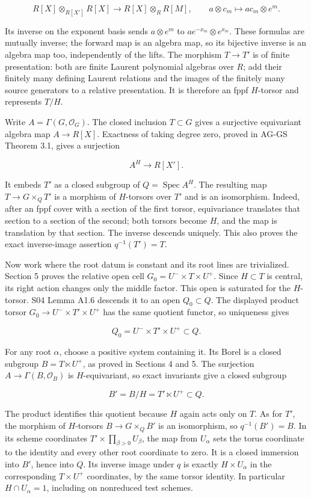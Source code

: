 \documentclass[11pt,a4paper,openany]{report}
\begin{document}
\[
R[X]\otimes_{R[X']}R[X]\longrightarrow R[X]\otimes_RR[M],
\qquad a\otimes c_m\longmapsto ac_m\otimes e^m.
\]

Its inverse on the exponent basis sends \(a\otimes e^m\) to \(ae^{-x_m}\otimes e^{x_m}\). These formulas are mutually inverse; the forward map is an algebra map, so its bijective inverse is an algebra map too, independently of the lifts. The morphism \(T\to T'\) is of finite presentation: both are finite Laurent polynomial algebras over \(R\); add their finitely many defining Laurent relations and the images of the finitely many source generators to a relative presentation. It is therefore an fppf \(H\)-torsor and represents \(T/H\).

Write \(A=\Gamma(G,\mathcal O_G)\). The closed inclusion \(T\subset G\) gives a surjective equivariant algebra map \(A\to R[X]\). Exactness of taking degree zero, proved in AG-GS Theorem 3.1, gives a surjection

\[
A^H\longrightarrow R[X'].
\]

It embeds \(T'\) as a closed subgroup of \(Q=\operatorname{Spec}A^H\). The resulting map \(T\to G\times_QT'\) is a morphism of \(H\)-torsors over \(T'\) and is an isomorphism. Indeed, after an fppf cover with a section of the first torsor, equivariance translates that section to a section of the second; both torsors become \(H\), and the map is translation by that section. The inverse descends uniquely. This also proves the exact inverse-image assertion \(q^{-1}(T')=T\).

Now work where the root datum is constant and its root lines are trivialized. Section 5 proves the relative open cell \(G_0=U^-\times T\times U^+\). Since \(H\subset T\) is central, its right action changes only the middle factor. This open is saturated for the \(H\)-torsor. S04 Lemma A1.6 descends it to an open \(Q_0\subset Q\). The displayed product torsor \(G_0\to U^-\times T'\times U^+\) has the same quotient functor, so uniqueness gives

\[
Q_0=U^-\times T'\times U^+\subset Q.
\tag{7.1}
\]

For any root \(\alpha\), choose a positive system containing it. Its Borel is a closed subgroup \(B=T\ltimes U^+\), as proved in Sections 4 and 5. The surjection \(A\to\Gamma(B,\mathcal O_B)\) is \(H\)-equivariant, so exact invariants give a closed subgroup

\[
B'=B/H=T'\ltimes U^+\subset Q.
\]

The product identifies this quotient because \(H\) again acts only on \(T\). As for \(T'\), the morphism of \(H\)-torsors \(B\to G\times_QB'\) is an isomorphism, so \(q^{-1}(B')=B\). In its scheme coordinates \(T'\times\prod_{\beta>0}U_\beta\), the map from \(U_\alpha\) sets the torus coordinate to the identity and every other root coordinate to zero. It is a closed immersion into \(B'\), hence into \(Q\). Its inverse image under \(q\) is exactly \(H\times U_\alpha\) in the corresponding \(T\times U^+\) coordinates, by the same torsor identity. In particular \(H\cap U_\alpha=1\), including on nonreduced test schemes.
\end{document}
